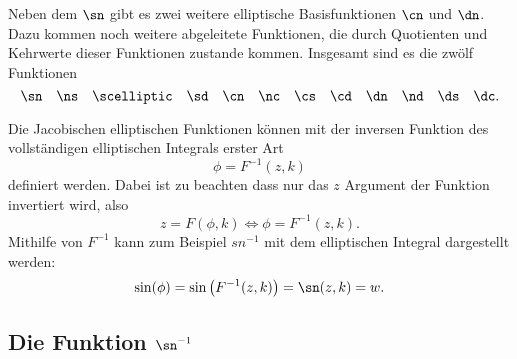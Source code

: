 Neben dem $\sn$ gibt es zwei weitere elliptische Basisfunktionen $\cn$ und $\dn$.
Dazu kommen noch weitere abgeleitete Funktionen, die durch Quotienten und Kehrwerte dieser Funktionen zustande kommen.
Insgesamt sind es die zwölf Funktionen
\begin{equation*}
    \sn \quad
    \ns \quad
    \scelliptic \quad
    \sd \quad
    \cn \quad
    \nc \quad
    \cs \quad
    \cd \quad
    \dn \quad
    \nd \quad
    \ds \quad
    \dc.
\end{equation*}

Die Jacobischen elliptischen Funktionen können mit der inversen Funktion des vollständigen elliptischen Integrals erster Art
\begin{equation}
    \phi = F^{-1}(z, k)
\end{equation}
definiert werden. Dabei ist zu beachten dass nur das $z$ Argument der Funktion invertiert wird, also
\begin{equation}
    z = F(\phi, k)
    \Leftrightarrow
    \phi = F^{-1}(z, k).
\end{equation}
Mithilfe von $F^{-1}$ kann zum Beispiel $sn^{-1}$ mit dem elliptischen Integral dargestellt werden:
\begin{equation}
    \sin(\phi)
    =
    \sin \left( F^{-1}(z, k) \right)
    =
    \sn(z, k)
    =
    w.
\end{equation}




\subsection{Die Funktion $\sn^{-1}$}

